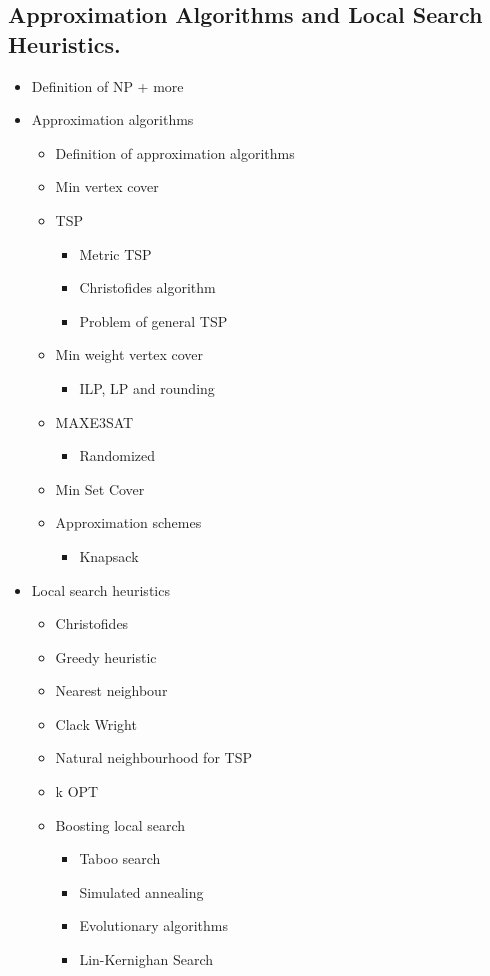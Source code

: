\documentclass[11pt]{article}
\begin{document}
\subsection{Approximation Algorithms and Local Search Heuristics.}
\label{sec:org270c534}
\begin{itemize}
\item Definition of NP + more
\item Approximation algorithms
\begin{itemize}
\item Definition of approximation algorithms
\item Min vertex cover
\item TSP
\begin{itemize}
\item Metric TSP
\item Christofides algorithm
\item Problem of general TSP
\end{itemize}
\item Min weight vertex cover
\begin{itemize}
\item ILP, LP and rounding
\end{itemize}
\item MAXE3SAT
\begin{itemize}
\item Randomized
\end{itemize}
\item Min Set Cover
\item Approximation schemes
\begin{itemize}
\item Knapsack
\end{itemize}
\end{itemize}

\item Local search heuristics
\begin{itemize}
\item Christofides
\item Greedy heuristic
\item Nearest neighbour
\item Clack Wright
\item Natural neighbourhood for TSP
\item k OPT
\item Boosting local search
\begin{itemize}
\item Taboo search
\item Simulated annealing
\item Evolutionary algorithms
\item Lin-Kernighan Search
\end{itemize}
\end{itemize}
\end{itemize}
\end{document}
